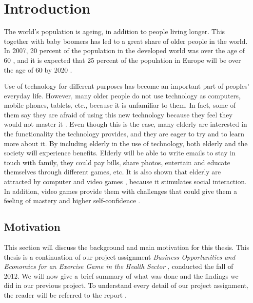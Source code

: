 \chapter{Introduction}


The world's population is ageing, in addition to people living longer. This together with baby boomers has led to a great share of older people in the world. In 2007, 20 percent of the population in the developed world was over the age of 60 \cite{dickinson2007methods}, and it is expected that 25 percent of the population in Europe will be over the age of 60 by 2020 \cite{ijsselsteijn2007digital}. 

Use of technology for different purposes has become an important part of peoples' everyday life. However, many older people do not use technology as computers, mobile phones, tablets, etc., because it is unfamiliar to them. In fact, some of them say they are afraid of using this new technology because they feel they would not master it \cite{mmi}. Even though this is the case, many elderly are interested in the functionality the technology provides, and they are eager to try and to learn more about it. By including elderly in the use of technology, both elderly and the society will experience benefits. Elderly will be able to write emails to stay in touch with family, they could pay bills, share photos, entertain and educate themselves through different games, etc. It is also shown that elderly are attracted by computer and video games \cite{mmi} \cite{ijsselsteijn2007digital}, because it stimulates social interaction. In addition, video games provide them with challenges that could give them a feeling of mastery and higher self-confidence \cite{mmi}. 



\section{Motivation}
This section will discuss the background and main motivation for this thesis. 
This thesis is a continuation of our project assignment \emph{Business Opportunities and Economics for an Exercise Game in the Health Sector} \cite{project}, conducted the fall of 2012. We will now give a brief summary of what was done and the findings we did in our previous project. To understand every detail of our project assignment, the reader will be referred to the report \cite{project}.   


